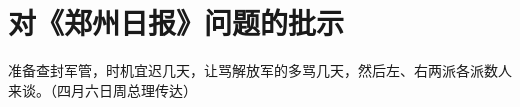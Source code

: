 \section[对《郑州日报》问题的批示（一九六七年二月）]{对《郑州日报》问题的批示}


准备查封军管，时机宜迟几天，让骂解放军的多骂几天，然后左、右两派各派数人来谈。（四月六日周总理传达）


